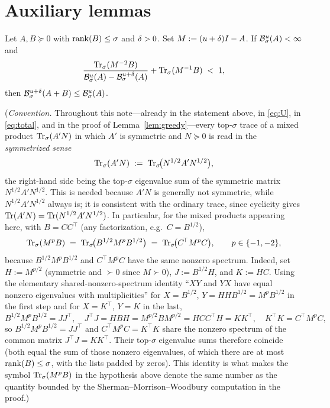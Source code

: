 \section*{Auxiliary lemmas}

\begin{qsixlemma}\label{lem:bu}
Let $A,B\succeq 0$ with $\operatorname{rank}(B)\le\sigma$ and $\delta>0$. Set $M:=(u+\delta)I-A$. If
$\mathcal{B}^{u}_{\sigma}(A)<\infty$ and
\[
  \frac{\operatorname{Tr}_{\sigma}(M^{-2}B)}{\mathcal{B}^{u}_{\sigma}(A)-\mathcal{B}^{u+\delta}_{\sigma}(A)}
   + \operatorname{Tr}_{\sigma}(M^{-1}B) \;<\; 1,
\]
then $\mathcal{B}^{u+\delta}_{\sigma}(A+B)\le\mathcal{B}^{u}_{\sigma}(A)$.

\smallskip
\noindent\textup{(\emph{Convention.}} Throughout this note---already in the
statement above, in \eqref{eq:U}, in \eqref{eq:total}, and in the proof of
Lemma~\textup{\ref{lem:greedy}}---every top-$\sigma$ trace of a mixed product
$\operatorname{Tr}_{\sigma}(A'N)$ in which $A'$ is symmetric and $N\succeq0$ is read in the
\emph{symmetrized sense}
\[
  \operatorname{Tr}_{\sigma}(A'N) \;:=\; \operatorname{Tr}_{\sigma}\!\bigl(N^{1/2}A'N^{1/2}\bigr),
\]
the right-hand side being the top-$\sigma$ eigenvalue sum of the symmetric matrix
$N^{1/2}A'N^{1/2}$.  This is needed because $A'N$ is generally not symmetric, while
$N^{1/2}A'N^{1/2}$ always is; it is consistent with the ordinary trace, since
cyclicity gives $\operatorname{Tr}(A'N)=\operatorname{Tr}(N^{1/2}A'N^{1/2})$.  In particular, for the
mixed products appearing here, with $B=CC^{\!\top}$ \textup{(}any factorization,
e.g.\ $C=B^{1/2}$\textup{)},
\begin{equation}\label{eq:bu-shared-spectrum}
  \operatorname{Tr}_{\sigma}(M^{p}B) \;=\; \operatorname{Tr}_{\sigma}\!\bigl(B^{1/2}M^{p}B^{1/2}\bigr)
                 \;=\; \operatorname{Tr}_{\sigma}\!\bigl(C^{\!\top}M^{p}C\bigr),
  \qquad p\in\{-1,-2\},
\end{equation}
because $B^{1/2}M^{p}B^{1/2}$ and $C^{\!\top}M^{p}C$ have the same nonzero
spectrum.  Indeed, set $H:=M^{p/2}$ \textup{(}symmetric and $\succ0$ since
$M\succ0$\textup{)}, $J:=B^{1/2}H$, and $K:=HC$.  Using the elementary
shared-nonzero-spectrum identity ``$XY$ and $YX$ have equal nonzero eigenvalues
with multiplicities'' for $X=B^{1/2}$, $Y=HHB^{1/2}=M^{p}B^{1/2}$ in the first
step and for $X=K^{\!\top}$, $Y=K$ in the last,
\[
  B^{1/2}M^{p}B^{1/2}=JJ^{\!\top},\quad
  J^{\!\top}J=HBH=M^{p/2}BM^{p/2}=HCC^{\!\top}H=KK^{\!\top},\quad
  K^{\!\top}K=C^{\!\top}M^{p}C,
\]
so $B^{1/2}M^{p}B^{1/2}=JJ^{\!\top}$ and $C^{\!\top}M^{p}C=K^{\!\top}K$ share the
nonzero spectrum of the common matrix $J^{\!\top}J=KK^{\!\top}$.  Their top-$\sigma$
eigenvalue sums therefore coincide \textup{(}both equal the sum of those nonzero
eigenvalues, of which there are at most $\operatorname{rank}(B)\le\sigma$, with the lists
padded by zeros\textup{)}.
This identity is what makes the symbol $\operatorname{Tr}_{\sigma}(M^{p}B)$ in the hypothesis above
denote the same number as the quantity bounded by the Sherman--Morrison--Woodbury
computation in the proof.\textup{)}
\end{qsixlemma}

